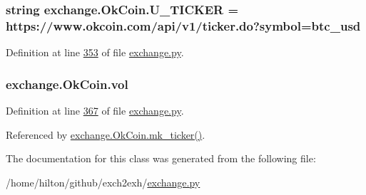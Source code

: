\subsubsection[{\texorpdfstring{U\+\_\+\+T\+I\+C\+K\+ER}{U_TICKER}}]{\setlength{\rightskip}{0pt plus 5cm}string exchange.\+Ok\+Coin.\+U\+\_\+\+T\+I\+C\+K\+ER = \textquotesingle{}https\+://www.\+okcoin.\+com/api/v1/ticker.\+do?symbol=btc\+\_\+usd\textquotesingle{}\hspace{0.3cm}{\ttfamily [static]}}\hypertarget{classexchange_1_1_ok_coin_a81305ced2eb23b94feb7195d1d42afc2}{}\label{classexchange_1_1_ok_coin_a81305ced2eb23b94feb7195d1d42afc2}


Definition at line \hyperlink{exchange_8py_source_l00353}{353} of file \hyperlink{exchange_8py_source}{exchange.\+py}.

\subsubsection[{\texorpdfstring{vol}{vol}}]{\setlength{\rightskip}{0pt plus 5cm}exchange.\+Ok\+Coin.\+vol}\hypertarget{classexchange_1_1_ok_coin_ad0e78d6b3c0a24504be72a0216fc6549}{}\label{classexchange_1_1_ok_coin_ad0e78d6b3c0a24504be72a0216fc6549}


Definition at line \hyperlink{exchange_8py_source_l00367}{367} of file \hyperlink{exchange_8py_source}{exchange.\+py}.



Referenced by \hyperlink{exchange_8py_source_l00385}{exchange.\+Ok\+Coin.\+mk\+\_\+ticker()}.



The documentation for this class was generated from the following file\+:\begin{DoxyCompactItemize}
\item 
/home/hilton/github/exch2exh/\hyperlink{exchange_8py}{exchange.\+py}\end{DoxyCompactItemize}
